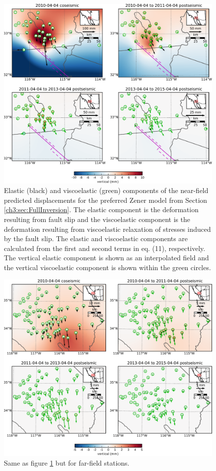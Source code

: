 \begin{figure}
\noindent\includegraphics[scale=0.9]{ch3/figures/2016jb013114-pS03}
\caption{Elastic (black) and viscoelastic (green) components of the
near-field predicted displacements for the preferred Zener model from
Section \ref{ch3:sec:FullInversion}.  The elastic component is the deformation resulting from
fault slip and the viscoelastic component is the deformation resulting
from viscoelastic relaxation of stresses induced by the fault slip.
The elastic and viscoelastic components are calculated from the first
and second terms in eq. (11), respectively.  The vertical elastic
component is shown as an interpolated field and the vertical
viscoelastic component is shown within the green circles.}
\label{ch3:fig:S3}
\end{figure}

\begin{figure}
\noindent\includegraphics[scale=0.9]{ch3/figures/2016jb013114-pS04}
\caption{Same as figure \ref{ch3:fig:S3} but for far-field stations.}
\label{ch3:fig:S4}
\end{figure}

